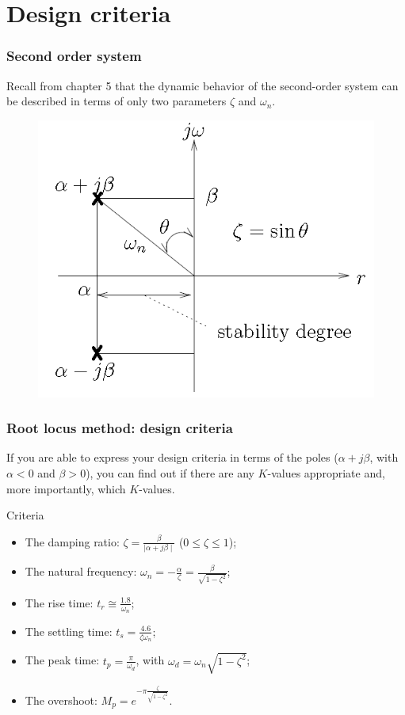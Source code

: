 \section{Design criteria}

\begin{frame}
\frametitle{Second order system}
	Recall from chapter 5 that the dynamic behavior of the second-order system can be described in terms of only two parameters $\zeta$ and $\omega_n$.
	\vspace{-1em}
	\begin{figure}
		\centering
		\includegraphics[width=0.6\linewidth]{poles_system}
	\end{figure}
\end{frame}

\begin{frame}
\frametitle{Root locus method: design criteria}
	If you are able to express your design criteria in terms of the poles ($\alpha + j\beta$, with $\alpha < 0$ and $\beta>0$), you can find out if there are any $K$-values appropriate and, more importantly, which $K$-values.\\
	\begin{block}{Criteria}
	\begin{itemize}
		\item The damping ratio: $\zeta = \frac{\beta}{\mid \alpha + j\beta\mid}$ ($0 \leq \zeta \leq 1$);
		\item The natural frequency: $\omega_n = -\frac{\alpha}{\zeta} = \frac{\beta}{\sqrt{1 - \zeta^2}}$;
		\item The rise time: $t_r \cong \frac{1.8}{\omega_n}$;
		\item The settling time: $t_s = \frac{4.6}{\zeta \omega_n}$;
		\item The peak time: $t_p =\frac{\pi}{\omega_d}$, with $\omega_d = \omega_n \sqrt{1 - \zeta^2} $;
		\item The overshoot: $M_p = e^{-\pi \frac{\zeta}{\sqrt{1 - \zeta^2}}}$.
	\end{itemize}
	\end{block}
\end{frame}

